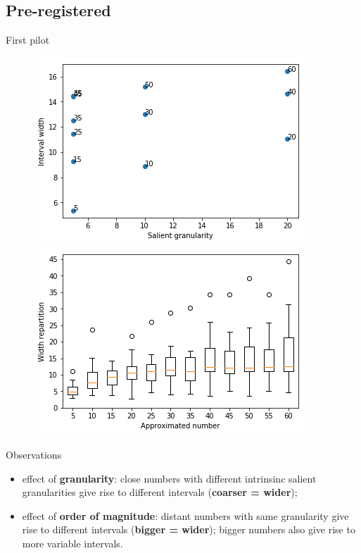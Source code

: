 \documentclass[xcolor=table, hyperref={pdfpagelabels=false}]{beamer}
\begin{document}
\subsection{Pre-registered}
\begin{frame}{First pilot}
\begin{figure}
	\includegraphics[width=.45\textwidth]{./images/pilote_1_av_width_by_g.png}
	\includegraphics[width=.45\textwidth]{./images/pilote_1_width_repartition.png}
\end{figure}
\begin{block}{Observations}
	\begin{itemize}
		\item effect of \textbf{granularity}: close numbers with different intrinsinc salient granularities give rise to different intervals (\textbf{coarser = wider});
		\item effect of \textbf{order of magnitude}: distant numbers with same granularity give rise to different intervals (\textbf{bigger = wider}); bigger numbers also give rise to more variable intervals.
	\end{itemize}
\end{block}
\end{frame}
\end{document}
